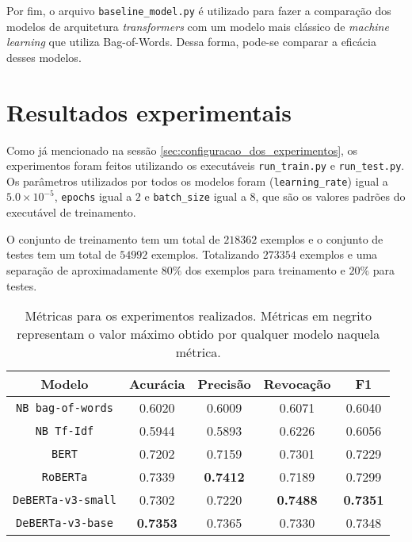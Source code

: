 Por fim, o arquivo \texttt{baseline\_model.py} é utilizado para fazer a
comparação dos modelos de arquitetura \textit{transformers} com um modelo mais
clássico de \textit{machine learning} que utiliza Bag-of-Words. Dessa forma,
pode-se comparar a eficácia desses modelos.

\section{Resultados experimentais}%
\label{sec:resultados_experimentais}

Como já mencionado na sessão \ref{sec:configuracao_dos_experimentos}, os
experimentos foram feitos utilizando os executáveis \texttt{run\_train.py} e
\texttt{run\_test.py}. Os parâmetros utilizados por todos os modelos foram
(\texttt{learning\_rate}) igual a $5.0\times 10^{-5}$, \texttt{epochs} igual a
$2$ e \texttt{batch\_size} igual a $8$, que são os valores padrões do executável
de treinamento.

O conjunto de treinamento tem um total de $218362$ exemplos e o conjunto de
testes tem um total de $54992$ exemplos. Totalizando $273354$ exemplos e uma
separação de aproximadamente $80\%$ dos exemplos para treinamento e $20\%$ para
testes.

\begin{table}[h]
\centering
\caption{Métricas para os experimentos realizados. Métricas em negrito
   representam o valor máximo obtido por qualquer modelo naquela métrica.}
\label{tab:experiments}
\begin{tabular}{c | c c c c}
   \textbf{Modelo} & \textbf{Acurácia} & \textbf{Precisão} & \textbf{Revocação}
                  & \textbf{F1} \\ \hline \hline
   \texttt{NB bag-of-words} & 0.6020 & 0.6009 & 0.6071 & 0.6040 \\
   \texttt{NB Tf-Idf} & 0.5944 & 0.5893 & 0.6226 & 0.6056 \\ \hline
   \texttt{BERT} & 0.7202 & 0.7159 & 0.7301 & 0.7229 \\
   \texttt{RoBERTa} & 0.7339 & \textbf{0.7412} & 0.7189 & 0.7299 \\
   \texttt{DeBERTa-v3-small} & 0.7302 & 0.7220 & \textbf{0.7488} & \textbf{0.7351} \\
   \texttt{DeBERTa-v3-base} & \textbf{0.7353} & 0.7365 & 0.7330 & 0.7348 \\ \hline
\end{tabular}
\end{table}

